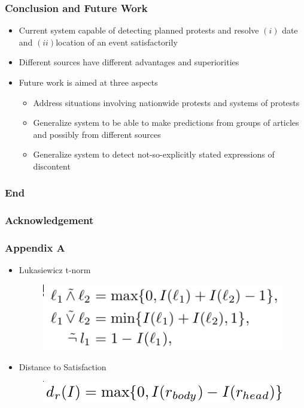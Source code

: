 \documentclass[red]{beamer}
\begin{document}
\begin{frame}
    \frametitle{Conclusion and Future Work}
    \begin{itemize}
        \item
            Current system capable of detecting planned protests and resolve $(i)$ date and $(ii)$location of an event satisfactorily
        \item
            Different sources have different advantages and superiorities
        \item
            Future work is aimed at three aspects
            \begin{itemize}
                \item
                    Address situations involving nationwide protests and systems of protests
                \item
                    Generalize system to be able to make predictions from groups of articles and possibly from different sources
                \item
                    Generalize system to detect not-so-explicitly stated expressions of discontent
                \end{itemize}
        \end{itemize}
\end{frame}

\begin{frame}
    \frametitle{End}
\end{frame}

\begin{frame}
    \frametitle{Acknowledgement}
\end{frame}


\begin{frame}[noframenumbering]
    \frametitle{Appendix A}
    \begin{itemize}
        \item  Lukasiewicz t-norm
    \begin{figure}
        \includegraphics[scale=0.4]{luke_norm}
    \end{figure}
    \item Distance to Satisfaction
    \begin{figure}
        \includegraphics[scale=0.4]{dis_sat_psl}
    \end{figure}
\end{itemize}
\end{frame}
\end{document}
